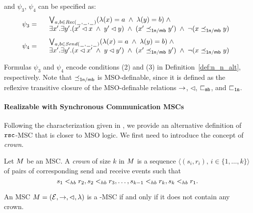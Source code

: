 \noindent and $\psi_3$, $\psi_4$ can be specified as:
\[
	\psi_3 =
	\begin{array}{rl}
		& \bigvee_{\substack{a,b \in {\mathit{Rec}(\hspace{0.1em}\underline{\hspace{0.5em}}\hspace{0.1em},\hspace{0.1em}\underline{\hspace{0.5em}}\hspace{0.1em},\hspace{0.1em}\underline{\hspace{0.5em}}\hspace{0.1em})}}}
		  (\lambda(x) = a \;\wedge\; \lambda(y) = b)
		  \;\wedge\; \\
		& \exists x'.\exists y'.(x' \lhd x \;\wedge\; y' \lhd y) \;\wedge\; (x' \preceq_{\mathsf{1n/\mathsf{mb}}} y') \;\wedge\; \neg(x \preceq_{\mathsf{1n/\mathsf{mb}}} y)\\
	\end{array}
\]
\[
	\psi_4 =
	\begin{array}{rl}
		& \bigvee_{\substack{a,b \in {\mathit{Send}(\hspace{0.1em}\underline{\hspace{0.5em}}\hspace{0.1em},\hspace{0.1em}\underline{\hspace{0.5em}}\hspace{0.1em},\hspace{0.1em}\underline{\hspace{0.5em}}\hspace{0.1em})}}}
		  (\lambda(x) = a \;\wedge\; \lambda(y) = b)
		  \;\wedge\; \\
		& \exists x'.\exists y'.(x \lhd x' \;\wedge\; y \lhd y') \;\wedge\; (x' \preceq_{\mathsf{1n/\mathsf{mb}}} y') \;\wedge\; \neg(x \preceq_{\mathsf{1n/\mathsf{mb}}} y)\\
	\end{array}
\]

Formulas $\psi_3$ and $\psi_4$ encode conditions (2) and (3) in Definition~\ref{def:n_n_alt}, respectively. Note that $\preceq_{\mathsf{1n/\mathsf{mb}}}$ is MSO-definable, since it is defined as the reflexive transitive closure of the MSO-definable relations $\to$, $\lhd$, $\sqsubset_{\mathtt{mb}}$, and $\sqsubset_{\mathtt{1n}}$.

\paragraph{\bf Realizable with Synchronous Communication MSCs} 

Following the characterization given in \cite[Theorem 4.4]{DBLP:journals/dc/Charron-BostMT96}, we  provide an alternative definition of $\mathtt{rsc}$-MSC that is closer to MSO logic. We first need to introduce the concept of \emph{crown}.

\begin{definition} [Crown]
	Let $M$ be an MSC. A \emph{crown} of size $k$ in $M$ is a sequence $\langle(s_i,r_i),\, i \in \{1,\dots,k\}\rangle$ of pairs of corresponding send and receive events such that
	\[
		s_1 <_{hb} r_2, s_2 <_{hb} r_3, \dots, s_{k-1} <_{hb} r_k, s_k <_{hb} r_1.
	\]
\end{definition}

\begin{definition} \label{def:rsc_alt}
	An MSC $M = (\mathcal{E},\to,\lhd,\lambda)$ is a \rsc-MSC if and only if it does not contain any crown.
\end{definition}

